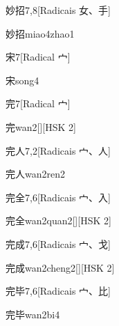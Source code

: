\begin{entry}{妙招}{7,8}[Radicais ⼥、⼿]
  \begin{phonetics}{妙招}{miao4zhao1}
  \end{phonetics}
\end{entry}

\begin{entry}{宋}{7}[Radical ⼧]
  \begin{phonetics}{宋}{song4}
  \end{phonetics}
\end{entry}

\begin{entry}{完}{7}[Radical ⼧]
  \begin{phonetics}{完}{wan2}[][HSK 2]
  \end{phonetics}
\end{entry}

\begin{entry}{完人}{7,2}[Radicais ⼧、⼈]
  \begin{phonetics}{完人}{wan2ren2}
  \end{phonetics}
\end{entry}

\begin{entry}{完全}{7,6}[Radicais ⼧、⼊]
  \begin{phonetics}{完全}{wan2quan2}[][HSK 2]
  \end{phonetics}
\end{entry}

\begin{entry}{完成}{7,6}[Radicais ⼧、⼽]
  \begin{phonetics}{完成}{wan2cheng2}[][HSK 2]
  \end{phonetics}
\end{entry}

\begin{entry}{完毕}{7,6}[Radicais ⼧、⽐]
  \begin{phonetics}{完毕}{wan2bi4}
  \end{phonetics}
\end{entry}

